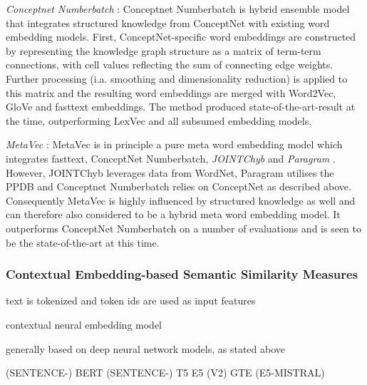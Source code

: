 \documentclass[11pt]{scrreprt}
\let\cite\parencite  %
\begin{document}

\textit{Conceptnet Numberbatch} \cite{speerConceptNetOpenMultilingual2018, speerConceptNetOpenMultilingual2017}: Conceptnet Numberbatch is hybrid ensemble model that integrates structured knowledge from ConceptNet with existing word embedding models. First, ConceptNet-specific word embeddings are constructed by representing the knowledge graph structure as a matrix of term-term connections, with cell values reflecting the sum of connecting edge weights. Further processing (i.a. smoothing and dimensionality reduction) is applied to this matrix and the resulting word embeddings are merged with Word2Vec, GloVe and fasttext embeddings. The method produced state-of-the-art-result at the time, outperforming LexVec and all subsumed embedding models.

\textit{MetaVec} \cite{garcia-ferreroBenchmarkingMetaembeddingsWhat2021}: MetaVec is in principle a pure meta word embedding model which integrates fasttext, ConceptNet Numberbatch, \textit{JOINTChyb} \cite{goikoetxeaBilingualEmbeddingsRandom2018a} and \textit{Paragram} \cite{wietingParaphraseDatabaseCompositional2015a}. However, JOINTChyb leverages data from WordNet, Paragram utilises the PPDB and Conceptnet Numberbatch relies on ConceptNet as described above. Consequently MetaVec is highly influenced by structured knowledge as well and can therefore also considered to be a hybrid meta word embedding model. It outperforms ConceptNet Numberbatch on a number of evaluations and is seen to be the state-of-the-art at this time. 




\subsubsection{Contextual Embedding-based Semantic Similarity Measures}

text is tokenized and token ids are used as input features


contextual neural embedding model

generally based on deep neural network models, as stated above


(SENTENCE-) BERT
(SENTENCE-) T5
E5 (V2)
GTE
(E5-MISTRAL)
\end{document}
